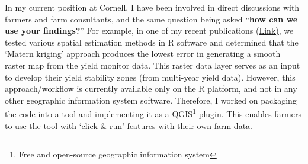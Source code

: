 \documentclass[11pt]{article}
\begin{document}


\vspace{-0.5em}\hspace{1.5em} In my current position at Cornell, I have been involved in direct discussions with farmers and farm consultants, and the same question being asked ``\textbf{how can we use your findings?}'' For example, in one of my recent publications \href{https://link.springer.com/article/10.1007/s11119-021-09793-z}{(Link)}, we tested various spatial estimation methods in R software and determined that the `Matern kriging' approach produces the lowest error in generating a smooth raster map from the yield monitor data. This raster data layer serves as an input to develop their yield stability zones (from multi-year yield data). However, this approach/workflow is currently available only on the R platform, and not in any other geographic information system software. Therefore, I worked on packaging the code into a tool and implementing it as a QGIS\footnote{Free and open-source geographic information system} plugin. This enables farmers to use the tool with `click \& run' features with their own farm data. 
\end{document}
